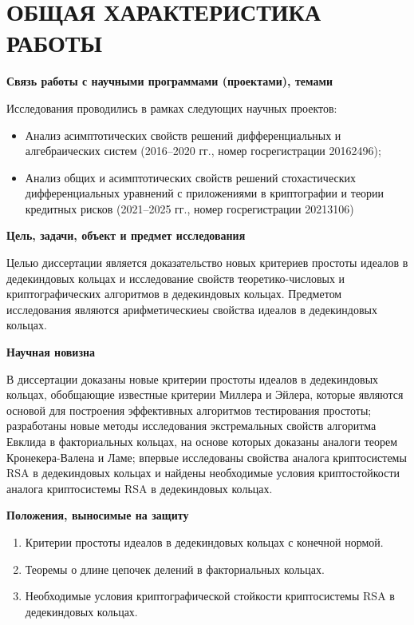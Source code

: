 \documentclass[_00_autoref.tex]{subfiles}
\begin{document}
{\let\clearpage\relax\vspace{2.2ex}
\chapter*{\MakeUppercase{ОБЩАЯ ХАРАКТЕРИСТИКА РАБОТЫ}}\vspace{-2ex}}

\medskip
\centerline{\textbf{Связь работы с научными программами (проектами), темами}}

Исследования проводились в рамках следующих научных проектов:
\begin{itemize}
    \item Анализ асимптотических свойств решений дифференциальных и алгебраических систем (2016--2020 гг., номер госрегистрации 20162496);

    \item Анализ общих и асимптотических свойств решений стохастических дифференциальных уравнений с приложениями в криптографии и теории кредитных рисков (2021--2025 гг., номер госрегистрации 20213106)
\end{itemize}

\pagebreak
\medskip
\centerline{\textbf{Цель, задачи, объект и предмет исследования}}

Целью диссертации является доказательство новых критериев простоты идеалов в дедекиндовых кольцах и исследование свойств теоретико-числовых и криптографических алгоритмов в дедекиндовых кольцах.
Предметом исследования являются арифметическиеы свойства идеалов в дедекиндовых кольцах.

\medskip
\centerline{\textbf{Научная новизна}}

В диссертации доказаны новые критерии простоты идеалов в дедекиндовых кольцах, обобщающие известные критерии Миллера и Эйлера, которые являются основой для построения эффективных алгоритмов тестирования простоты; разработаны новые методы исследования экстремальных свойств алгоритма Евклида в факториальных кольцах, на основе которых доказаны аналоги теорем Кронекера-Валена и Ламе; впервые исследованы свойства аналога криптосистемы RSA в дедекиндовых кольцах и найдены необходимые условия криптостойкости аналога криптосистемы RSA в дедекиндовых кольцах.

\medskip
\centerline{\textbf{Положения, выносимые на защиту}}

\begin{enumerate}
    \item Критерии простоты идеалов в дедекиндовых кольцах с конечной нормой.
    
    \item Теоремы о длине цепочек делений в факториальных кольцах.
    
    \item Необходимые условия криптографической стойкости криптосистемы RSA в дедекиндовых кольцах.
\end{enumerate}
\end{document}
